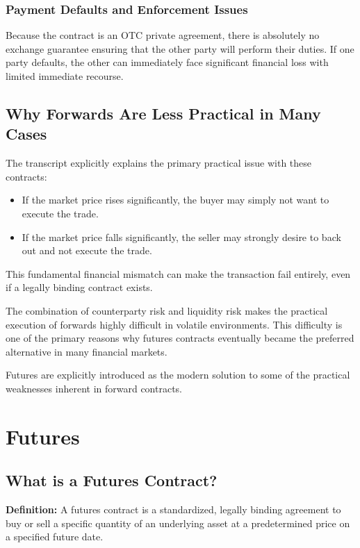 \documentclass[12pt,openany]{book}
\begin{document}
\subsubsection{Payment Defaults and Enforcement Issues}

Because the contract is an OTC private agreement, there is absolutely no exchange guarantee ensuring that the other party will perform their duties. If one party defaults, the other can immediately face significant financial loss with limited immediate recourse.

\subsection{Why Forwards Are Less Practical in Many Cases}

The transcript explicitly explains the primary practical issue with these contracts:

\begin{itemize}[leftmargin=*]
    \item If the market price rises significantly, the buyer may simply not want to execute the trade.
    \item If the market price falls significantly, the seller may strongly desire to back out and not execute the trade.
\end{itemize}

This fundamental financial mismatch can make the transaction fail entirely, even if a legally binding contract exists.

The combination of counterparty risk and liquidity risk makes the practical execution of forwards highly difficult in volatile environments. This difficulty is one of the primary reasons why futures contracts eventually became the preferred alternative in many financial markets.

Futures are explicitly introduced as the modern solution to some of the practical weaknesses inherent in forward contracts.


\section{Futures}

\subsection{What is a Futures Contract?}

\textbf{Definition:} A futures contract is a standardized, legally binding agreement to buy or sell a specific quantity of an underlying asset at a predetermined price on a specified future date.
\end{document}
